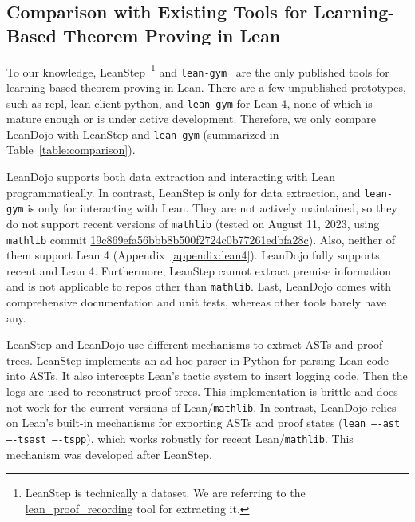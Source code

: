 \subsection{Comparison with Existing Tools for Learning-Based Theorem Proving in Lean}
\label{appendix:tool_comparison}

To our knowledge, LeanStep~\cite{han2022proof}\footnote{LeanStep is technically a dataset. We are referring to the \href{https://github.com/jasonrute/lean_proof_recording}{lean\_proof\_recording} tool for extracting it.} and \texttt{lean-gym}~\cite{polu2023formal} are the only published tools for learning-based theorem proving in Lean. There are a few unpublished prototypes, such as \href{https://github.com/leanprover-community/repl}{repl}, \href{https://github.com/leanprover-community/lean-client-python}{lean-client-python}, and \href{https://github.com/dselsam/lean-gym}{\texttt{lean-gym} for Lean 4}, none of which is mature enough or is under active development. Therefore, we only compare LeanDojo with LeanStep and \texttt{lean-gym} (summarized in Table~\ref{table:comparison}).

LeanDojo supports both data extraction and interacting with Lean programmatically. In contrast, LeanStep is only for data extraction, and \texttt{lean-gym} is only for interacting with Lean. They are not actively maintained, so they do not support recent versions of \texttt{mathlib} (tested on August 11, 2023, using \texttt{mathlib} commit \href{https://github.com/leanprover-community/mathlib/tree/19c869efa56bbb8b500f2724c0b77261edbfa28c}{19c869efa56bbb8b500f2724c0b77261edbfa28c}). Also, neither of them support Lean 4 (Appendix~\ref{appendix:lean4}). LeanDojo fully supports recent  and Lean 4. Furthermore, LeanStep cannot extract premise information and is not applicable to repos other than \texttt{mathlib}. Last, LeanDojo comes with comprehensive documentation and unit tests, whereas other tools barely have any.

LeanStep and LeanDojo use different mechanisms to extract ASTs and proof trees. LeanStep implements an ad-hoc parser in Python for parsing Lean code into ASTs. It also intercepts Lean's tactic system to insert logging code. Then the logs are used to reconstruct proof trees. This implementation is brittle and does not work for the current versions of Lean/\texttt{mathlib}. In contrast, LeanDojo relies on Lean’s built-in mechanisms for exporting ASTs and proof states (\texttt{lean ----ast ----tsast ----tspp}), which works robustly for recent Lean/\texttt{mathlib}. This mechanism was developed after LeanStep.

